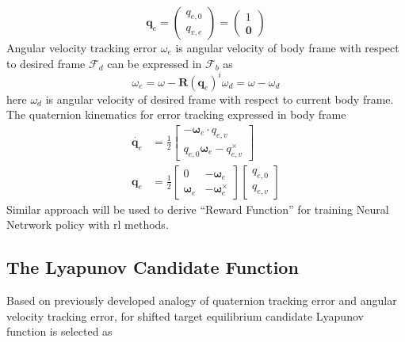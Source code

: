 \begin{equation}
\mathbf{q}_{e} =\begin{pmatrix}
q_{e,0}\\
q_{v,e}
\end{pmatrix} =\begin{pmatrix}
1\\
\mathbf{0}
\end{pmatrix}
\end{equation}Angular velocity tracking error $\displaystyle \omega _{e}$ is angular velocity of body frame with respect to desired frame $\displaystyle \mathcal{F}_{d}$ can be expressed in $\displaystyle \mathcal{F}_{b}$ as 
\label{eqn:qe_zero}
\begin{equation*}
\omega _{e} =\omega -\mathbf{R} (\mathbf{q}_{e} )^{i} \omega _{d} =\omega -\omega _{d}
\end{equation*}
here $\displaystyle \omega _{d}$ is angular velocity of desired frame with respect to current body frame. The quaternion kinematics for error tracking expressed in body frame
\begin{equation}
\begin{aligned}
\dot{\mathbf{q}_{e}} & =\frac{1}{2}\begin{bmatrix}
-\mathbf{\omega }_{e} \cdot q_{e,v}\\
q_{e,0}\mathbf{\omega }_{e} -q^{\times }_{e,v}
\end{bmatrix}\\
\mathbf{q}_{e} & =\frac{1}{2}\begin{bmatrix}
0 & -\mathbf{\omega }_{e}\\
\mathbf{\omega }_{e} & -\mathbf{\omega }^{\times }_{e}
\end{bmatrix}\begin{bmatrix}
q_{e,0}\\
q_{e,v}
\end{bmatrix}
\end{aligned}
\end{equation}
Similar approach will be used to derive ``Reward Function'' for training Neural Netrwork policy with \acrfull{rl} methods.
\subsection{The Lyapunov Candidate Function}
Based on previously developed analogy of quaternion tracking error and angular velocity tracking error, for shifted target equilibrium candidate Lyapunov function is selected as

